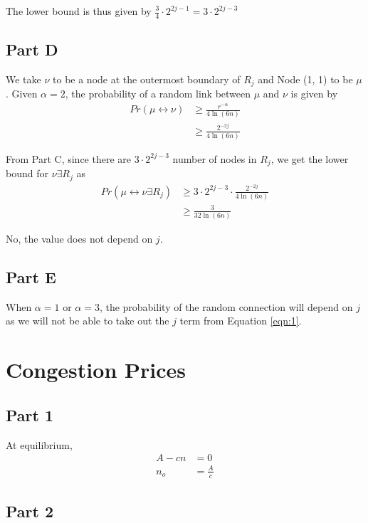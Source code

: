 \documentclass[]{article}
\newcommand{\e}{&=}
\begin{document}
The lower bound is thus given by $\frac{3}{4} \cdot 2^{2j-1} = 3 \cdot 2^{2j-3}$

\subsection*{Part D}

We take $\nu$ to be a node at the outermost boundary of $R_j$ and Node (1, 1) to be $\mu$. Given $\alpha = 2$, the probability of a random link between $\mu$ and $\nu$ is given by
\begin{align*}
Pr(\mu \leftrightarrow \nu) &\geq \frac{r^{-\alpha}}{4 \ln (6n)} \\
	&\geq \frac{2^{-2j}}{4 \ln (6n)}
\end{align*}

From Part C, since there are $3 \cdot 2^{2j-3}$ number of nodes in $R_j$, we get the lower bound for $\nu \exists R_j$ as
\begin{align*}
Pr(\mu \leftrightarrow \nu \exists R_j) &\geq 
	3 \cdot 2^{2j-3} \cdot \frac{2^{-2j}}{4 \ln (6n)} \tag{1} \label{eqn:1}\\
&\geq \frac{3}{32 \ln (6n)}
\end{align*}

No, the value does not depend on $j$.

\subsection*{Part E}

When $\alpha = 1$ or $\alpha=3$, the probability of the random connection will depend on  $j$ as we will not be able to take out the $j$ term from Equation \eqref{eqn:1}.

\newpage
\section*{Congestion Prices}

\subsection*{Part 1}

At equilibrium,
\begin{align*}
A  - cn \e 0 \\
n_o \e \frac{A}{c}
\end{align*}

\subsection*{Part 2}
\end{document}
